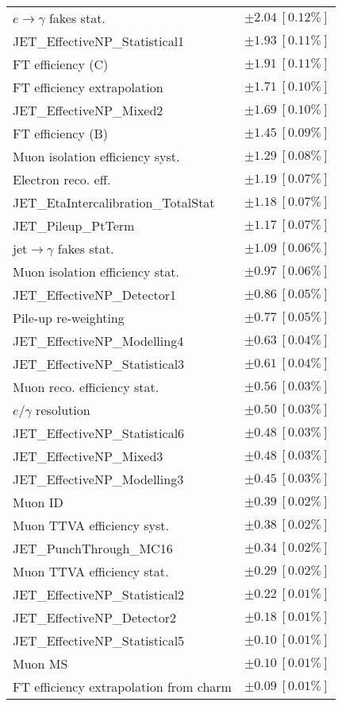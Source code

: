 \begin{tabular}{lr}
$e\to\gamma$ fakes stat. & $\pm 2.04\ [0.12\%]$ \\
JET\_EffectiveNP\_Statistical1 & $\pm 1.93\ [0.11\%]$ \\
FT efficiency (C) & $\pm 1.91\ [0.11\%]$ \\
FT efficiency extrapolation & $\pm 1.71\ [0.10\%]$ \\
JET\_EffectiveNP\_Mixed2 & $\pm 1.69\ [0.10\%]$ \\
FT efficiency (B) & $\pm 1.45\ [0.09\%]$ \\
Muon isolation efficiency syst. & $\pm 1.29\ [0.08\%]$ \\
Electron reco. eff. & $\pm 1.19\ [0.07\%]$ \\
JET\_EtaIntercalibration\_TotalStat & $\pm 1.18\ [0.07\%]$ \\
JET\_Pileup\_PtTerm & $\pm 1.17\ [0.07\%]$ \\
jet$\to\gamma$ fakes stat. & $\pm 1.09\ [0.06\%]$ \\
Muon isolation efficiency stat. & $\pm 0.97\ [0.06\%]$ \\
JET\_EffectiveNP\_Detector1 & $\pm 0.86\ [0.05\%]$ \\
Pile-up re-weighting & $\pm 0.77\ [0.05\%]$ \\
JET\_EffectiveNP\_Modelling4 & $\pm 0.63\ [0.04\%]$ \\
JET\_EffectiveNP\_Statistical3 & $\pm 0.61\ [0.04\%]$ \\
Muon reco. efficiency stat. & $\pm 0.56\ [0.03\%]$ \\
$e/\gamma$ resolution & $\pm 0.50\ [0.03\%]$ \\
JET\_EffectiveNP\_Statistical6 & $\pm 0.48\ [0.03\%]$ \\
JET\_EffectiveNP\_Mixed3 & $\pm 0.48\ [0.03\%]$ \\
JET\_EffectiveNP\_Modelling3 & $\pm 0.45\ [0.03\%]$ \\
Muon ID & $\pm 0.39\ [0.02\%]$ \\
Muon TTVA efficiency syst. & $\pm 0.38\ [0.02\%]$ \\
JET\_PunchThrough\_MC16 & $\pm 0.34\ [0.02\%]$ \\
Muon TTVA efficiency stat. & $\pm 0.29\ [0.02\%]$ \\
JET\_EffectiveNP\_Statistical2 & $\pm 0.22\ [0.01\%]$ \\
JET\_EffectiveNP\_Detector2 & $\pm 0.18\ [0.01\%]$ \\
JET\_EffectiveNP\_Statistical5 & $\pm 0.10\ [0.01\%]$ \\
Muon MS & $\pm 0.10\ [0.01\%]$ \\
FT efficiency extrapolation from charm & $\pm 0.09\ [0.01\%]$ \\
\hline
\end{tabular}
